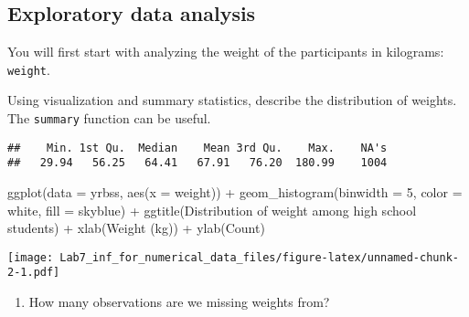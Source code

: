 \documentclass[
]{article}
\newenvironment{Shaded}{\begin{snugshade}}{\end{snugshade}}
\newcommand{\AttributeTok}[1]{\textcolor[rgb]{0.77,0.63,0.00}{#1}}
\newcommand{\DecValTok}[1]{\textcolor[rgb]{0.00,0.00,0.81}{#1}}
\newcommand{\FunctionTok}[1]{\textcolor[rgb]{0.00,0.00,0.00}{#1}}
\newcommand{\NormalTok}[1]{#1}
\newcommand{\SpecialCharTok}[1]{\textcolor[rgb]{0.00,0.00,0.00}{#1}}
\newcommand{\StringTok}[1]{\textcolor[rgb]{0.31,0.60,0.02}{#1}}
\providecommand{\tightlist}{%
  \setlength{\itemsep}{0pt}\setlength{\parskip}{0pt}}
\begin{document}
\hypertarget{exploratory-data-analysis}{%
\subsection{Exploratory data analysis}\label{exploratory-data-analysis}}

You will first start with analyzing the weight of the participants in
kilograms: \texttt{weight}.

Using visualization and summary statistics, describe the distribution of
weights. The \texttt{summary} function can be useful.

\begin{Shaded}
\end{Shaded}

\begin{verbatim}
##    Min. 1st Qu.  Median    Mean 3rd Qu.    Max.    NA's 
##   29.94   56.25   64.41   67.91   76.20  180.99    1004
\end{verbatim}

\begin{Shaded}
\begin{Highlighting}[]
\FunctionTok{ggplot}\NormalTok{(}\AttributeTok{data =}\NormalTok{ yrbss, }\FunctionTok{aes}\NormalTok{(}\AttributeTok{x =}\NormalTok{ weight)) }\SpecialCharTok{+} 
  \FunctionTok{geom\_histogram}\NormalTok{(}\AttributeTok{binwidth =} \DecValTok{5}\NormalTok{, }\AttributeTok{color =} \StringTok{\textquotesingle{}white\textquotesingle{}}\NormalTok{, }\AttributeTok{fill =} \StringTok{\textquotesingle{}skyblue\textquotesingle{}}\NormalTok{) }\SpecialCharTok{+}
  \FunctionTok{ggtitle}\NormalTok{(}\StringTok{\textquotesingle{}Distribution of weight among high school students\textquotesingle{}}\NormalTok{) }\SpecialCharTok{+}
  \FunctionTok{xlab}\NormalTok{(}\StringTok{\textquotesingle{}Weight (kg)\textquotesingle{}}\NormalTok{) }\SpecialCharTok{+} \FunctionTok{ylab}\NormalTok{(}\StringTok{\textquotesingle{}Count\textquotesingle{}}\NormalTok{)}
\end{Highlighting}
\end{Shaded}

\texttt{[image: Lab7\_inf\_for\_numerical\_data\_files/figure-latex/unnamed-chunk-2-1.pdf]}

\begin{enumerate}
\def\labelenumi{\arabic{enumi}.}
\setcounter{enumi}{1}
\tightlist
\item
  How many observations are we missing weights from?
\end{enumerate}
\end{document}
